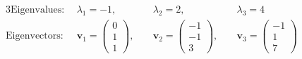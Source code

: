 \documentclass[a4paper,11pt]{article}
\begin{document}
\begin{preview}
\begin{enumerate}
		\begin{alignat*}{3}
			\mathrm{Eigenvalues:} \; &\lambda_1 = -1, \;\; &&\lambda_2 = 2, \;\; &&\lambda_3 = 4 \\
			\mathrm{Eigenvectors:} \; &\textbf{v}_1 = \begin{pmatrix}0\\1\\1\end{pmatrix}, \; &&\textbf{v}_2= \begin{pmatrix}-1\\-1\\3\end{pmatrix}, \; &&\textbf{v}_3= \begin{pmatrix}-1\\1\\7\end{pmatrix}
	  \end{alignat*}



        
  \end{enumerate}

\end{preview}
\end{document}
